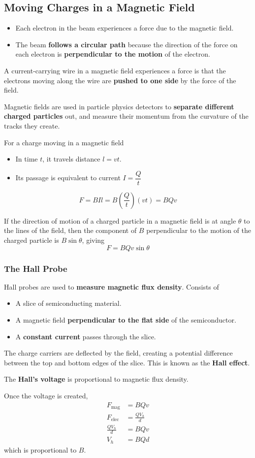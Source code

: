 \subsection{Moving Charges in a Magnetic Field}

\begin{itemize}
    \item Each electron in the beam experiences a force due to the magnetic field.
    \item The beam \textbf{follows a circular path} because the direction of the force on each electron is \textbf{perpendicular to the motion} of the electron.
\end{itemize}

A current-carrying wire in a magnetic field experiences a force is that the electrons moving along the wire are \textbf{pushed to one side} by the force of the field.

Magnetic fields are used in particle physics detectors to \textbf{separate different charged particles} out, and measure their momentum from the curvature of the tracks they create.

For a charge moving in a magnetic field
\begin{itemize}
    \item In time $t$, it travels distance $l=vt$.
    \item Its passage is equivalent to current $I=\dfrac{Q}{t}$
\end{itemize}
$$F=BIl=B\left(\frac{Q}{t}\right)(vt)=BQv$$

If the direction of motion of a charged particle in a magnetic field is at angle $\theta$ to the lines of the field, then the component of $B$ perpendicular to the motion of the charged particle is $B\sin\theta$, giving
$$F=BQv\sin\theta$$

\subsubsection*{The Hall Probe}

Hall probes are used to \textbf{measure magnetic flux density}. Consists of
\begin{itemize}
    \item A slice of semiconducting material.
    \item A magnetic field \textbf{perpendicular to the flat side} of the semiconductor.
    \item A \textbf{constant current} passes through the slice.
\end{itemize}

The charge carriers are deflected by the field, creating a potential difference between the top and bottom edges of the slice. This is known as the \textbf{Hall effect}.

The \textbf{Hall's voltage} is proportional to magnetic flux density.

Once the voltage is created,
\begin{align*}
    F_\text{mag}&=BQv\\
    F_\text{elec}&=\frac{QV_h}{d}\\
    \frac{QV_h}{d}&=BQv\\
    V_h&=BQd
\end{align*}
which is proportional to $B$.
